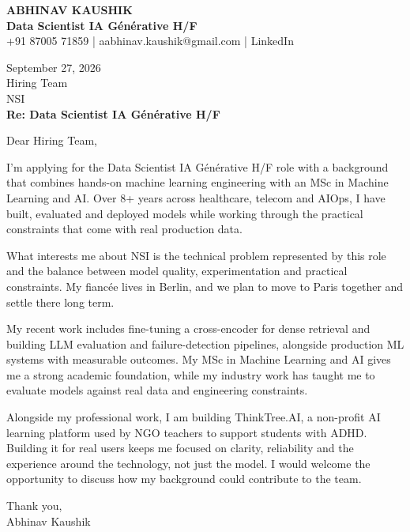 \documentclass[10pt,a4paper]{article}
\begin{document}
\begin{center}
{\Large\bfseries ABHINAV KAUSHIK}\\[2pt]
{\bfseries Data Scientist IA Générative H/F}\\[2pt]
+91 87005 71859 \quad | \quad aabhinav.kaushik@gmail.com \quad | \quad LinkedIn
\end{center}
\vspace{8pt}
September 27, 2026\\[6pt]
Hiring Team\\
NSI\\[4pt]
\textbf{Re: Data Scientist IA Générative H/F}

Dear Hiring Team,

I’m applying for the Data Scientist IA Générative H/F role with a background that combines hands-on machine learning engineering with an MSc in Machine Learning and AI. Over 8+ years across healthcare, telecom and AIOps, I have built, evaluated and deployed models while working through the practical constraints that come with real production data.

What interests me about NSI is the technical problem represented by this role and the balance between model quality, experimentation and practical constraints. My fiancée lives in Berlin, and we plan to move to Paris together and settle there long term.

My recent work includes fine-tuning a cross-encoder for dense retrieval and building LLM evaluation and failure-detection pipelines, alongside production ML systems with measurable outcomes. My MSc in Machine Learning and AI gives me a strong academic foundation, while my industry work has taught me to evaluate models against real data and engineering constraints.

Alongside my professional work, I am building ThinkTree.AI, a non-profit AI learning platform used by NGO teachers to support students with ADHD. Building it for real users keeps me focused on clarity, reliability and the experience around the technology, not just the model. I would welcome the opportunity to discuss how my background could contribute to the team.

Thank you,\\
Abhinav Kaushik
\end{document}
